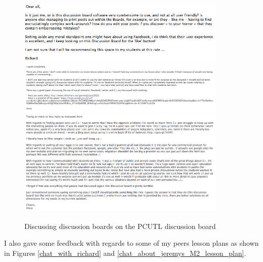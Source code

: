 \documentclass[a4paper,12pt]{article}
\begin{document}
\begin{figure}[htdp]
    \begin{center}
        \includegraphics[width=10cm]{./images/Discussion_board-a}
        \includegraphics[width=10cm]{./images/Discussion_board-b}
        \includegraphics[width=10cm]{./images/Discussion_board-c}
    \end{center}
    \caption{Discussing discussion boards on the PCUTL discussion board}
    \label{Discussion_board}
\end{figure}

I also gave some feedback with regards to some of my peers lesson plans as shown in Figures \ref{chat_with_richard} and \ref{chat_about_jeremys_M2_lesson_plan}.\\
\end{document}
